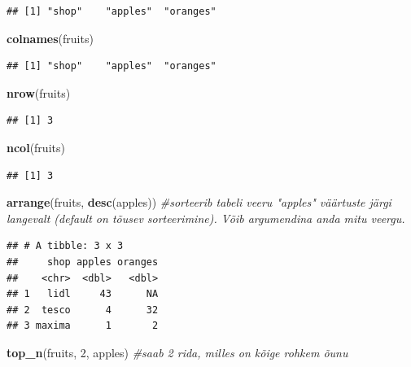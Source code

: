 \documentclass[]{book}
\newenvironment{Shaded}{\begin{snugshade}}{\end{snugshade}}
\newcommand{\KeywordTok}[1]{\textcolor[rgb]{0.13,0.29,0.53}{\textbf{#1}}}
\newcommand{\DecValTok}[1]{\textcolor[rgb]{0.00,0.00,0.81}{#1}}
\newcommand{\CommentTok}[1]{\textcolor[rgb]{0.56,0.35,0.01}{\textit{#1}}}
\newcommand{\NormalTok}[1]{#1}
\begin{document}
\begin{verbatim}
## [1] "shop"    "apples"  "oranges"
\end{verbatim}

\begin{Shaded}
\begin{Highlighting}[]
\KeywordTok{colnames}\NormalTok{(fruits)}
\end{Highlighting}
\end{Shaded}

\begin{verbatim}
## [1] "shop"    "apples"  "oranges"
\end{verbatim}

\begin{Shaded}
\begin{Highlighting}[]
\KeywordTok{nrow}\NormalTok{(fruits)}
\end{Highlighting}
\end{Shaded}

\begin{verbatim}
## [1] 3
\end{verbatim}

\begin{Shaded}
\begin{Highlighting}[]
\KeywordTok{ncol}\NormalTok{(fruits)}
\end{Highlighting}
\end{Shaded}

\begin{verbatim}
## [1] 3
\end{verbatim}

\begin{Shaded}
\begin{Highlighting}[]
\KeywordTok{arrange}\NormalTok{(fruits, }\KeywordTok{desc}\NormalTok{(apples)) }\CommentTok{#sorteerib tabeli veeru "apples" väärtuste järgi langevalt (default on tõusev sorteerimine). Võib argumendina anda mitu veergu.}
\end{Highlighting}
\end{Shaded}

\begin{verbatim}
## # A tibble: 3 x 3
##     shop apples oranges
##    <chr>  <dbl>   <dbl>
## 1   lidl     43      NA
## 2  tesco      4      32
## 3 maxima      1       2
\end{verbatim}

\begin{Shaded}
\begin{Highlighting}[]
\KeywordTok{top_n}\NormalTok{(fruits, }\DecValTok{2}\NormalTok{, apples) }\CommentTok{#saab 2 rida, milles on kõige rohkem õunu}
\end{Highlighting}
\end{Shaded}
\end{document}
